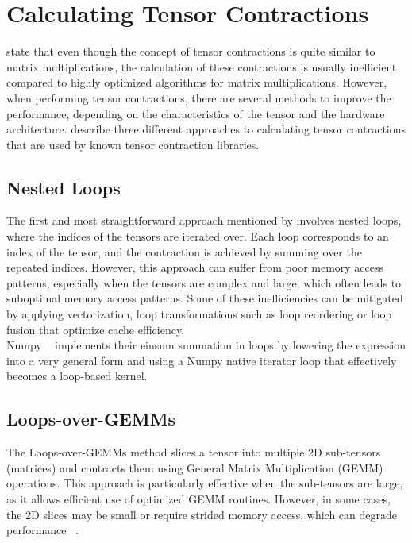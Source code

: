 \section{Calculating Tensor Contractions}
\textcite{springer} state that even though the concept of tensor contractions is quite similar to matrix multiplications, the calculation of these contractions is usually inefficient compared to highly optimized algorithms for matrix multiplications. However, when performing tensor contractions, there are several methods to improve the performance, depending on the characteristics of the tensor and the hardware architecture. \textcite{springer} describe three different approaches to calculating tensor contractions that are used by known tensor contraction libraries.  

\subsection{Nested Loops}
The first and most straightforward approach mentioned by \textcite{springer} involves nested loops, where the indices of the tensors are iterated over. Each loop corresponds to an index of the tensor, and the contraction is achieved by summing over the repeated indices. However, this approach can suffer from poor memory access patterns, especially when the tensors are complex and large, which often leads to suboptimal memory access patterns. Some of these inefficiencies can be mitigated by applying vectorization, loop transformations such as loop reordering or loop fusion that optimize cache efficiency.\\
Numpy ~\cite{Numpy} implements their einsum summation in loops by lowering the expression into a very general form and using a Numpy native iterator loop that effectively becomes a loop-based kernel.

\subsection{Loops-over-GEMMs}
The Loops-over-GEMMs method slices a tensor into multiple 2D sub-tensors (matrices) and contracts them using General Matrix Multiplication (GEMM) operations. This approach is particularly effective when the sub-tensors are large, as it allows efficient use of optimized GEMM routines. However, in some cases, the 2D slices may be small or require strided memory access, which can degrade performance ~\cite{springer}.

